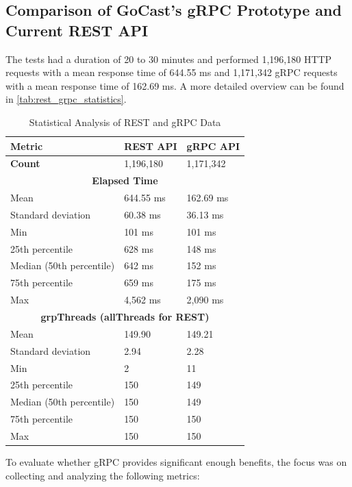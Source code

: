 \subsection{Comparison of GoCast's gRPC Prototype and Current REST API}
The tests had a duration of 20 to 30 minutes and performed 1,196,180 HTTP requests with a mean response time of 644.55 ms and 1,171,342 gRPC requests with a mean response time of 162.69 ms. A more detailed overview can be found in \autoref{tab:rest_grpc_statistics}.

\begin{table}[htbp]
\centering
\caption{Statistical Analysis of REST and gRPC Data}
\label{tab:rest_grpc_statistics}
\begin{tabular}{|l|l|l|}
\hline
\textbf{Metric} & \textbf{REST \ac{API}} & \textbf{gRPC \ac{API}} \\ \hline
\textbf{Count} & 1,196,180 & 1,171,342 \\ \hline
\multicolumn{3}{|c|}{\textbf{Elapsed Time}} \\ \hline
Mean & 644.55 ms & 162.69 ms \\ \hline
Standard deviation & 60.38 ms & 36.13 ms \\ \hline
Min & 101 ms & 101 ms \\ \hline
25th percentile & 628 ms & 148 ms \\ \hline
Median (50th percentile) & 642 ms & 152 ms \\ \hline
75th percentile & 659 ms & 175 ms \\ \hline
Max & 4,562 ms & 2,090 ms \\ \hline
\multicolumn{3}{|c|}{\textbf{grpThreads (allThreads for REST)}} \\ \hline
Mean & 149.90 & 149.21 \\ \hline
Standard deviation & 2.94 & 2.28 \\ \hline
Min & 2 & 11 \\ \hline
25th percentile & 150 & 149 \\ \hline
Median (50th percentile) & 150 & 149 \\ \hline
75th percentile & 150 & 150 \\ \hline
Max & 150 & 150 \\ \hline
\end{tabular}
\end{table}

To evaluate whether gRPC provides significant enough benefits, the focus was on collecting and analyzing the following metrics:

